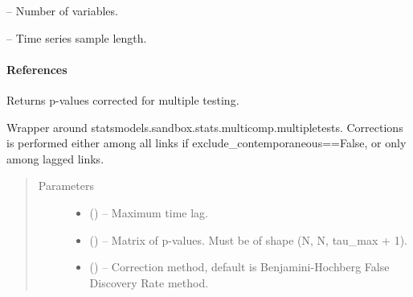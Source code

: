 \documentclass[letterpaper,10pt,english]{sphinxmanual}
\begin{document}
\begin{fulllineitems}
\begin{fulllineitems}
\end{fulllineitems}


\begin{fulllineitems}
\label{\detokenize{index:PCMCI.N}}
 -- Number of variables.

\end{fulllineitems}


\begin{fulllineitems}
\label{\detokenize{index:PCMCI.T}}
 -- Time series sample length.

\end{fulllineitems}

\paragraph{References}

\begin{fulllineitems}
\label{\detokenize{index:tigramite.pcmci.PCMCI.get_corrected_pvalues}}
Returns p-values corrected for multiple testing.

Wrapper around statsmodels.sandbox.stats.multicomp.multipletests.
Corrections is performed either among all links if
exclude\_contemporaneous==False, or only among lagged links.
\begin{quote}\begin{description}
\item[{Parameters}] \leavevmode\begin{itemize}
\item {} 
 () -- Maximum time lag.

\item {} 
 () -- Matrix of p-values. Must be of shape (N, N, tau\_max + 1).

\item {} 
 (\sphinxstyleliteralemphasis{, }\sphinxstyleliteralemphasis{ (}\sphinxstyleliteralemphasis{)}\sphinxstyleliteralemphasis{}) -- Correction method, default is Benjamini-Hochberg False Discovery
Rate method.


\end{itemize}
\end{description}
\end{quote}
\end{fulllineitems}
\end{fulllineitems}
\end{document}
